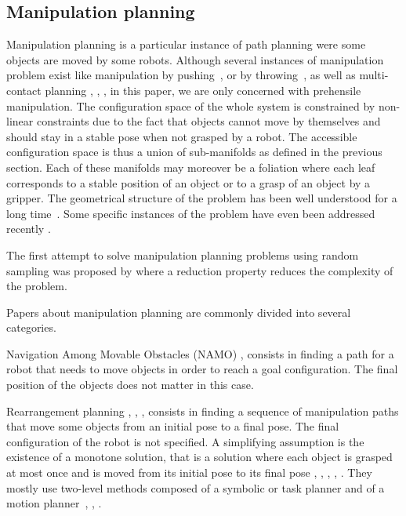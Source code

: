 \subsection{Manipulation planning}

Manipulation planning is a particular instance of path planning were
some objects are moved by some robots.
Although several instances of
manipulation problem exist like manipulation by
pushing~\cite{BenRiv1998}, or by throwing~\cite{WooZacLyn2017}, as well as
multi-contact planning \cite{Bretl2006}, \cite{LenVaiYosKhe2013},
\cite{TonDelPetParManMan2018}, in this paper, we are only concerned with
prehensile manipulation.
The configuration space of the whole system is constrained by
non-linear constraints due to the fact that objects cannot move by
themselves and should stay in a stable pose when not grasped by a
robot.  The accessible configuration space is thus a union of
sub-manifolds as defined in the previous section. Each of these
manifolds may moreover be a foliation where each leaf corresponds to a
stable position of an object or to a grasp of an object by a
gripper. The geometrical structure of the problem has been well
understood for a long time~\cite{AlaSimLau89}. Some specific instances of the
problem have even been addressed recently \cite{vendittelli-2018}.

The first attempt to solve manipulation planning problems using random sampling
was proposed by \cite{simeon2004ijrr} where a reduction property reduces the
complexity of the problem.

Papers about manipulation planning are commonly divided into several categories.

Navigation Among Movable Obstacles (NAMO) \cite{wilfong1988motion}, \cite{stilman2008planning} consists in finding
a path for a robot that needs to move objects in order to reach a goal
configuration. The final position of the objects does not matter in this case.

Rearrangement planning \cite{ota2004rearrangement}, \cite{LIS210},
\cite{KroBek2015}, \cite{LerPha2015} consists in finding a sequence of
manipulation paths that move some objects from an initial pose to a
final pose. The final configuration of the robot is not specified. A
simplifying assumption is the existence of a monotone solution, that is
a solution where each object is grasped at most once and is moved from
its initial pose to its final pose \cite{stilman2008planning},
\cite{stilman2007manipulation}, \cite{srivastavaetal2014icra}, \cite{nieuwenhuisen2008effective},
\cite{ota2004rearrangement}. They mostly use two-level methods
composed of a symbolic or task planner and of a motion
planner~\cite{cambon:hal-01976081}, \cite{KaeLoz2013}, \cite{18-toussaint-RSS}.

